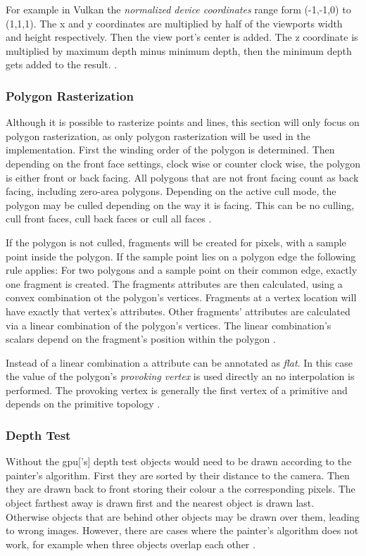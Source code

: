 For example in Vulkan the \textit{normalized device coordinates} range form (-1,-1,0) to (1,1,1). The x and y coordinates are multiplied by half of the viewports width and height respectively. Then the view port's center is added. The z coordinate is multiplied by maximum depth minus minimum depth, then the minimum depth gets added to the result. \cite{khronos:vulkan:spec1.1}.

\subsubsection{Polygon Rasterization}
Although it is possible to rasterize points and lines, this section will only focus on polygon rasterization, as only polygon rasterization will be used in the implementation. First the winding order of the polygon is determined. Then depending on the front face settings, clock wise or counter clock wise, the polygon is either front or back facing. All polygons that are not front facing count as back facing, including zero-area polygons. Depending on the active cull mode, the polygon may be culled depending on the way it is facing. This can be no culling, cull front faces, cull back faces or cull all faces \cite{akine:2018:realtime, khronos:vulkan:spec1.1}.

If the polygon is not culled, fragments will be created for pixels, with a sample point inside the polygon. If the sample point lies on a polygon edge the following rule applies: For two polygons and a sample point on their common edge, exactly one fragment is created. The fragments attributes are then calculated, using a convex combination ot the polygon's vertices. Fragments at a vertex location will have exactly that vertex's attributes. Other fragments' attributes are calculated via a linear combination of the polygon's vertices. The linear combination's scalars depend on the fragment's position within the polygon \cite{akine:2018:realtime, khronos:vulkan:spec1.1}.

Instead of a linear combination a attribute can be annotated  as \textit{flat}. In this case the value of the polygon's \textit{provoking vertex} is used directly an no interpolation is performed. The provoking vertex is generally the first vertex of a primitive and depends on the primitive topology \cite{akine:2018:realtime, khronos:vulkan:spec1.1}.


\subsubsection{Depth Test}
\label{section:depthtest}
Without the \gls{gpu}['s] depth test objects would need to be drawn according to the painter's algorithm. First they are sorted by their distance to the camera. Then they are drawn back to front storing their colour a the corresponding pixels. The object farthest away is drawn first and the nearest object is drawn last. Otherwise objects that are behind other objects may be drawn over them, leading to wrong images. However, there are cases where the painter's algorithm does not work, for example when three objects overlap each other \cite{akine:2018:realtime}.


